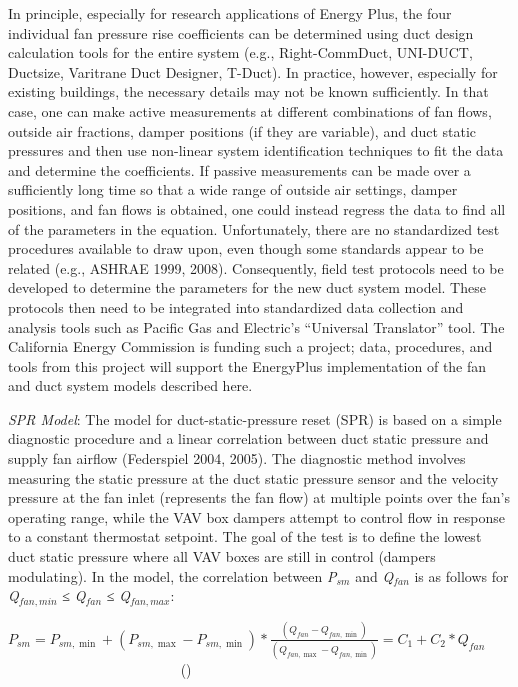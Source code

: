 In principle, especially for research applications of Energy Plus, the four individual fan pressure rise coefficients can be determined using duct design calculation tools for the entire system (e.g., Right-CommDuct, UNI-DUCT, Ductsize, Varitrane Duct Designer, T-Duct). In practice, however, especially for existing buildings, the necessary details may not be known sufficiently. In that case, one can make active measurements at different combinations of fan flows, outside air fractions, damper positions (if they are variable), and duct static pressures and then use non-linear system identification techniques to fit the data and determine the coefficients. If passive measurements can be made over a sufficiently long time so that a wide range of outside air settings, damper positions, and fan flows is obtained, one could instead regress the data to find all of the parameters in the equation. Unfortunately, there are no standardized test procedures available to draw upon, even though some standards appear to be related (e.g., ASHRAE 1999, 2008). Consequently, field test protocols need to be developed to determine the parameters for the new duct system model. These protocols then need to be integrated into standardized data collection and analysis tools such as Pacific Gas and Electric's ``Universal Translator'' tool. The California Energy Commission is funding such a project; data, procedures, and tools from this project will support the EnergyPlus implementation of the fan and duct system models described here.

\emph{SPR Model}: The model for duct-static-pressure reset (SPR) is based on a simple diagnostic procedure and a linear correlation between duct static pressure and supply fan airflow (Federspiel 2004, 2005). The diagnostic method involves measuring the static pressure at the duct static pressure sensor and the velocity pressure at the fan inlet (represents the fan flow) at multiple points over the fan's operating range, while the VAV box dampers attempt to control flow in response to a constant thermostat setpoint. The goal of the test is to define the lowest duct static pressure where all VAV boxes are still in control (dampers modulating). In the model, the correlation between \emph{P\(_{sm}\)} and \emph{Q\(_{fan}\)} is as follows for \emph{Q\(_{fan,min}\)} ≤ \emph{Q\(_{fan}\)} ≤ \emph{Q\(_{fan,max}\)}:

\({P_{sm}} = {P_{sm,\min }} + \left( {{P_{sm,\max }} - {P_{sm,\min }}} \right)*\frac{{\left( {{Q_{fan}} - {Q_{fan,\min }}} \right)}}{{\left( {{Q_{fan,\max }} - {Q_{fan,\min }}} \right)}} = {C_1} + {C_2}*{Q_{fan}}\) ~~~~~~~~~~~~~~~~~~~~~~~~ ()

